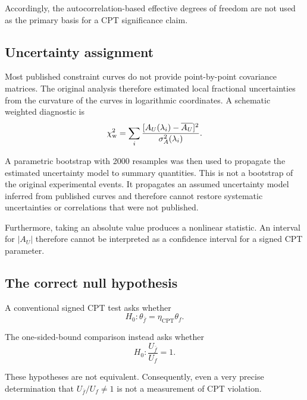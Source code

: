 \documentclass[aps,prd,reprint,superscriptaddress,nofootinbib]{revtex4-2}
\newcommand{\CPT}{\mathrm{CPT}}
\begin{document}
	Accordingly, the autocorrelation-based effective degrees of freedom are
	not used as the primary basis for a CPT significance claim.
	
	\subsection{Uncertainty assignment}
	
	Most published constraint curves do not provide point-by-point
	covariance matrices. The original analysis therefore estimated local
	fractional uncertainties from the curvature of the curves in
	logarithmic coordinates. A schematic weighted diagnostic is
	\begin{equation}
		\chi^2_{\rm w}
		=
		\sum_i
		\frac{
			[A_U(\lambda_i)-\overline{A_U}]^2
		}{
			\sigma_A^2(\lambda_i)
		}.
		\label{eq:chiweighted}
	\end{equation}
	
	A parametric bootstrap with 2000 resamples was then used to propagate
	the estimated uncertainty model to summary quantities. This is not a
	bootstrap of the original experimental events. It propagates an
	assumed uncertainty model inferred from published curves and therefore
	cannot restore systematic uncertainties or correlations that were not
	published.
	
	Furthermore, taking an absolute value produces a nonlinear statistic.
	An interval for $|A_U|$ therefore cannot be interpreted as a confidence
	interval for a signed CPT parameter.
	
	\subsection{The correct null hypothesis}
	
	A conventional signed CPT test asks whether
	\begin{equation}
		H_0:
		\theta_{\bar f}=\eta_\CPT\theta_f.
		\label{eq:nullCPT}
	\end{equation}
	
	The one-sided-bound comparison instead asks whether
	\begin{equation}
		H_0:
		\frac{U_{\bar f}}{U_f}=1.
		\label{eq:nullsens}
	\end{equation}
	
	These hypotheses are not equivalent. Consequently, even a very precise
	determination that $U_{\bar f}/U_f\neq1$ is not a measurement of
	CPT violation.
	
\end{document}
